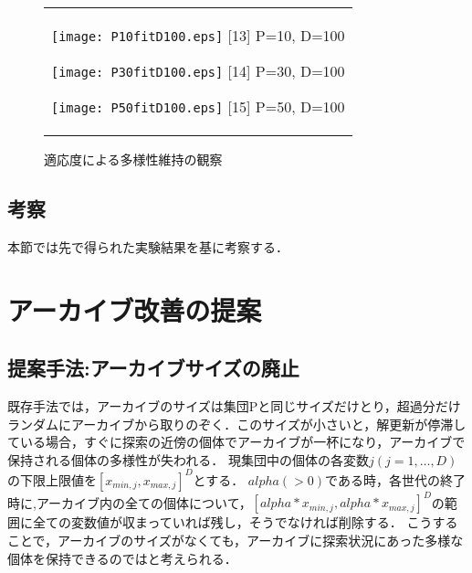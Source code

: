 \documentclass[a4paper,11pt,oneside,openany]{jsbook}
\begin{document}
\begin{figure}[htbp]
  \begin{center}
    \begin{tabular}{c}


      \begin{minipage}{0.33\hsize}
        \begin{center}
          \texttt{[image: P10fitD100.eps]}
          \hspace{1.2cm} [13] P=10, D=100
        \end{center}
      \end{minipage}

      \begin{minipage}{0.33\hsize}
        \begin{center}
          \texttt{[image: P30fitD100.eps]}
          \hspace{1.2cm} [14] P=30, D=100
        \end{center}
      \end{minipage}

      \begin{minipage}{0.33\hsize}
        \begin{center}
          \texttt{[image: P50fitD100.eps]}
          \hspace{1.2cm} [15] P=50, D=100
        \end{center}
      \end{minipage}
    \end{tabular}
    \caption{適応度による多様性維持の観察}
    \label{fig:lena}
  \end{center}
\end{figure}

\section{考察}
本節では先で得られた実験結果を基に考察する．

\chapter{アーカイブ改善の提案}
\section{提案手法:アーカイブサイズの廃止}
既存手法では，アーカイブのサイズは集団Pと同じサイズだけとり，超過分だけランダムにアーカイブから取りのぞく．このサイズが小さいと，解更新が停滞している場合，すぐに探索の近傍の個体でアーカイブが一杯になり，アーカイブで保持される個体の多様性が失われる．
現集団中の個体の各変数$j(j = 1, \dots,D)$の下限上限値を$[x_{min,j},x_{max,j}]^D$とする．
$alpha(>0)$である時，各世代の終了時に,アーカイブ内の全ての個体について，$[alpha *x_{min,j},alpha*x_{max,j}]^D$の範囲に全ての変数値が収まっていれば残し，そうでなければ削除する．
こうすることで，アーカイブのサイズがなくても，アーカイブに探索状況にあった多様な個体を保持できるのではと考えられる．
\end{document}
